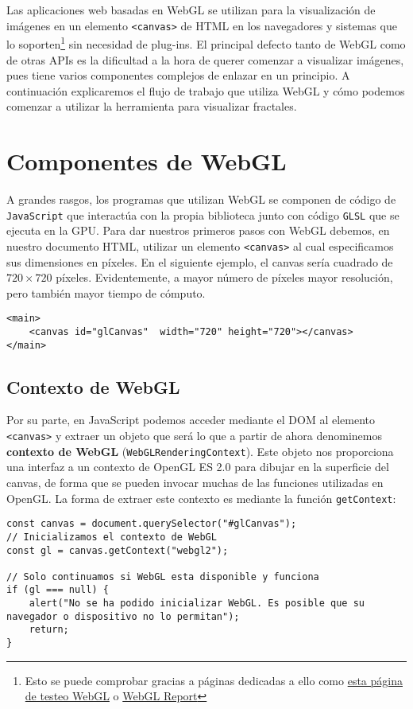 Las aplicaciones web basadas en WebGL se utilizan para la visualización de imágenes en un elemento \verb|<canvas>| de HTML en los navegadores y sistemas que lo soporten\footnote{Esto se puede comprobar gracias a páginas dedicadas a ello como \href{https://get.webgl.org/}{esta página de testeo WebGL} o \href{http://webglreport.com/}{WebGL Report}} sin necesidad de plug-ins. El principal defecto tanto de WebGL como de otras APIs es la dificultad a la hora de querer comenzar a visualizar imágenes, pues tiene varios componentes complejos de enlazar en un principio. A continuación explicaremos el flujo de trabajo que utiliza WebGL y cómo podemos comenzar a utilizar la herramienta para visualizar fractales.

\section{Componentes de WebGL}
\label{section:componentes-wgl}

A grandes rasgos, los programas que utilizan WebGL se componen de código de \verb|JavaScript| que interactúa con la propia biblioteca junto con código \verb|GLSL| que se ejecuta en la GPU. Para dar nuestros primeros pasos con WebGL debemos, en nuestro documento HTML, utilizar un elemento \verb|<canvas>| al cual especificamos sus dimensiones en píxeles. En el siguiente ejemplo, el canvas sería cuadrado de $720\times 720$ píxeles. Evidentemente, a mayor número de píxeles mayor resolución, pero también mayor tiempo de cómputo.

\begin{lstlisting}
<main>
    <canvas id="glCanvas"  width="720" height="720"></canvas>
</main>
\end{lstlisting}

\subsection{Contexto de WebGL}

Por su parte, en JavaScript podemos acceder mediante el DOM al elemento \verb|<canvas>| y extraer un objeto que será lo que a partir de ahora denominemos \textbf{contexto de WebGL} (\verb|WebGLRenderingContext|). Este objeto nos proporciona una interfaz a un contexto de OpenGL ES 2.0 para dibujar en la superficie del canvas, de forma que se pueden invocar muchas de las funciones utilizadas en OpenGL. La forma de extraer este contexto es mediante la función \verb|getContext|:

\begin{lstlisting}
const canvas = document.querySelector("#glCanvas");
// Inicializamos el contexto de WebGL
const gl = canvas.getContext("webgl2");

// Solo continuamos si WebGL esta disponible y funciona
if (gl === null) {
    alert("No se ha podido inicializar WebGL. Es posible que su navegador o dispositivo no lo permitan");
    return;
}
\end{lstlisting}

